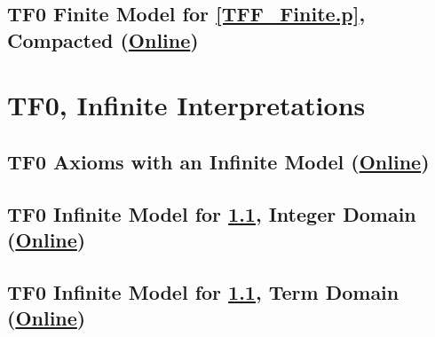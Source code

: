 \documentclass{easychair}
\begin{document}
\newpage
\subsection{TF0 Finite Model for \ref{TFF_Finite.p}, Compacted
(\href{https://raw.githubusercontent.com/GeoffsPapers/InterpretationFormat/master/Examples/TFF_Finite_Compact.s}{Online})}
\label{TFF_Finite_Compact.s}
\begin{small}

\end{small}

\newpage
\section{TF0, Infinite Interpretations}
\label{TF0Infinite}

\subsection{TF0 Axioms with an Infinite Model
(\href{https://raw.githubusercontent.com/GeoffsPapers/InterpretationFormat/master/Examples/TFF_Infinite.p}{Online})}
\label{TFF_Infinite.p}
\begin{small}

\end{small}

\newpage
\subsection{TF0 Infinite Model for \ref{TFF_Infinite.p}, Integer Domain
(\href{https://raw.githubusercontent.com/GeoffsPapers/InterpretationFormat/master/Examples/TFF_Integer.s}{Online})}
\label{TFF_Integer.s}
\begin{small}

\end{small}

\newpage
\subsection{TF0 Infinite Model for \ref{TFF_Infinite.p}, Term Domain
(\href{https://raw.githubusercontent.com/GeoffsPapers/InterpretationFormat/master/Examples/TFF_Peano.s}{Online})}
\label{TFF_Peano.s}
\begin{small}

\end{small}
\end{document}
